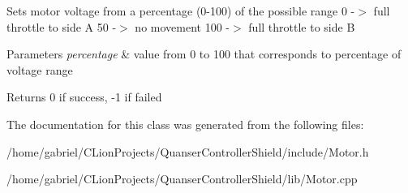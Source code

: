 Sets motor voltage from a percentage (0-\/100) of the possible range 0 -\/$>$ full throttle to side A 50 -\/$>$ no movement 100 -\/$>$ full throttle to side B 
\begin{DoxyParams}{Parameters}
{\em percentage} & value from 0 to 100 that corresponds to percentage of voltage range \\
\hline
\end{DoxyParams}
\begin{DoxyReturn}{Returns}
0 if success, -\/1 if failed 
\end{DoxyReturn}


The documentation for this class was generated from the following files\+:\begin{DoxyCompactItemize}
\item 
/home/gabriel/\+C\+Lion\+Projects/\+Quanser\+Controller\+Shield/include/Motor.\+h\item 
/home/gabriel/\+C\+Lion\+Projects/\+Quanser\+Controller\+Shield/lib/Motor.\+cpp\end{DoxyCompactItemize}
